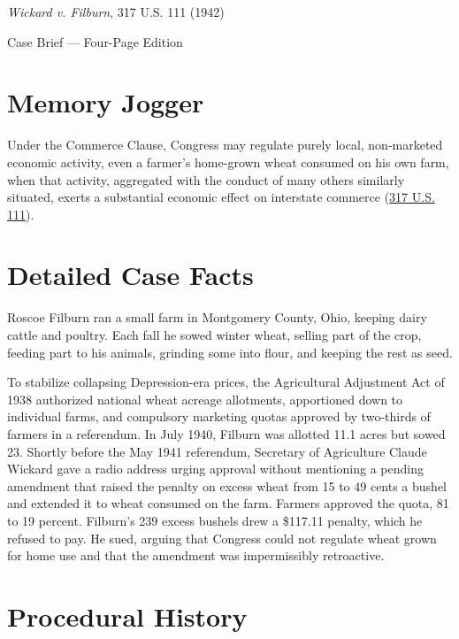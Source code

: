 \documentclass[12pt]{article}
\begin{document}
\begin{center}
{\LARGE \textit{Wickard v. Filburn}, 317 U.S. 111 (1942)\par}
\vspace{0.8em}
{\large Case Brief --- Four-Page Edition\par}
\end{center}
\vspace{1em}

\section{Memory Jogger}

Under the Commerce Clause, Congress may regulate purely local, non-marketed economic activity, even a farmer's home-grown wheat consumed on his own farm, when that activity, aggregated with the conduct of many others similarly situated, exerts a substantial economic effect on interstate commerce (\href{https://supreme.justia.com/cases/federal/us/317/111/}{317 U.S. 111}).

\section{Detailed Case Facts}

Roscoe Filburn ran a small farm in Montgomery County, Ohio, keeping dairy cattle and poultry. Each fall he sowed winter wheat, selling part of the crop, feeding part to his animals, grinding some into flour, and keeping the rest as seed.

To stabilize collapsing Depression-era prices, the Agricultural Adjustment Act of 1938 authorized national wheat acreage allotments, apportioned down to individual farms, and compulsory marketing quotas approved by two-thirds of farmers in a referendum. In July 1940, Filburn was allotted 11.1 acres but sowed 23. Shortly before the May 1941 referendum, Secretary of Agriculture Claude Wickard gave a radio address urging approval without mentioning a pending amendment that raised the penalty on excess wheat from 15 to 49 cents a bushel and extended it to wheat consumed on the farm. Farmers approved the quota, 81 to 19 percent. Filburn's 239 excess bushels drew a \$117.11 penalty, which he refused to pay. He sued, arguing that Congress could not regulate wheat grown for home use and that the amendment was impermissibly retroactive.

\section{Procedural History}
\end{document}
